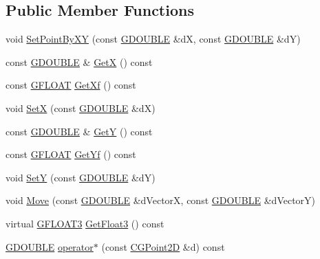 \subsection*{Public Member Functions}
\begin{DoxyCompactItemize}
\item 
void \hyperlink{class_c_g_point2_d_a882219dcf788b5f02d460ae23bee1982}{Set\+Point\+By\+X\+Y} (const \hyperlink{_g_types_8h_afd05ac85f90ee8e2a733928545462cd4}{G\+D\+O\+U\+B\+L\+E} \&d\+X, const \hyperlink{_g_types_8h_afd05ac85f90ee8e2a733928545462cd4}{G\+D\+O\+U\+B\+L\+E} \&d\+Y)
\item 
const \hyperlink{_g_types_8h_afd05ac85f90ee8e2a733928545462cd4}{G\+D\+O\+U\+B\+L\+E} \& \hyperlink{class_c_g_point2_d_ab59378f872c465d9f08df7519a800332}{Get\+X} () const 
\item 
const \hyperlink{_g_types_8h_abf6eba8223df62f199b811a6c52ff2ef}{G\+F\+L\+O\+A\+T} \hyperlink{class_c_g_point2_d_a22f85ca39b423d077c2a3b070252c874}{Get\+Xf} () const 
\item 
void \hyperlink{class_c_g_point2_d_a61d48972386bf9e08317c7347989fa4d}{Set\+X} (const \hyperlink{_g_types_8h_afd05ac85f90ee8e2a733928545462cd4}{G\+D\+O\+U\+B\+L\+E} \&d\+X)
\item 
const \hyperlink{_g_types_8h_afd05ac85f90ee8e2a733928545462cd4}{G\+D\+O\+U\+B\+L\+E} \& \hyperlink{class_c_g_point2_d_a0d04415f0e63b57f6a62418ce7793f34}{Get\+Y} () const 
\item 
const \hyperlink{_g_types_8h_abf6eba8223df62f199b811a6c52ff2ef}{G\+F\+L\+O\+A\+T} \hyperlink{class_c_g_point2_d_a181794e4c333183a841008e033305f27}{Get\+Yf} () const 
\item 
void \hyperlink{class_c_g_point2_d_a7c6af9a2a42553c5cb84070d40cc7bf0}{Set\+Y} (const \hyperlink{_g_types_8h_afd05ac85f90ee8e2a733928545462cd4}{G\+D\+O\+U\+B\+L\+E} \&d\+Y)
\item 
void \hyperlink{class_c_g_point2_d_a04b3cc2faa900c9fd8945bbb3177e8be}{Move} (const \hyperlink{_g_types_8h_afd05ac85f90ee8e2a733928545462cd4}{G\+D\+O\+U\+B\+L\+E} \&d\+Vector\+X, const \hyperlink{_g_types_8h_afd05ac85f90ee8e2a733928545462cd4}{G\+D\+O\+U\+B\+L\+E} \&d\+Vector\+Y)
\item 
virtual \hyperlink{_g_types_8h_a7f35886af6bc3271b59984611c1028fb}{G\+F\+L\+O\+A\+T3} \hyperlink{class_c_g_point2_d_a53e041230fffb40a9ecd601c63120229}{Get\+Float3} () const 
\item 
\hyperlink{_g_types_8h_afd05ac85f90ee8e2a733928545462cd4}{G\+D\+O\+U\+B\+L\+E} \hyperlink{class_c_g_point2_d_ad7f36e9bda45527e8804c6451136c751}{operator$\ast$} (const \hyperlink{class_c_g_point2_d}{C\+G\+Point2\+D} \&d) const 

\end{DoxyCompactItemize}
